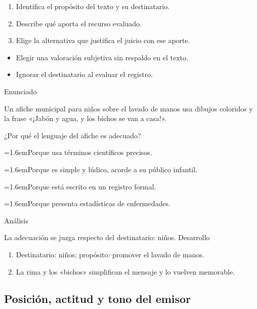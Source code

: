 \documentclass[10pt,a4paper,twocolumn]{article}
\newcommand{\alternativa}[2]{\par\noindent\hangindent=1.6em\hangafter=1\makebox[1.6em][l]{\tecla{#1}}#2\par}
\newcommand{\clave}[1]{\par\smallskip{\sffamily\footnotesize\color{esmeralda} Clave \teclaok{#1}}\par}
\begin{document}
\begin{metodo}
\begin{enumerate}
  \item Identifica el propósito del texto y su destinatario.
  \item Describe qué aporta el recurso evaluado.
  \item Elige la alternativa que justifica el juicio con ese aporte.
\end{enumerate}
\end{metodo}

\begin{errorfrecuente}
\begin{itemize}
  \item Elegir una valoración subjetiva sin respaldo en el texto.
  \item Ignorar el destinatario al evaluar el registro.
\end{itemize}
\end{errorfrecuente}

\begin{ejemplo}
{\sffamily\footnotesize\color{zinc500} Enunciado}\par
Un afiche municipal para niños sobre el lavado de manos usa dibujos coloridos y la frase «¡Jabón y agua, y los bichos se van a casa!».

¿Por qué el lenguaje del afiche es adecuado?
\alternativa{A}{Porque usa términos científicos precisos.}
\alternativa{B}{Porque es simple y lúdico, acorde a su público infantil.}
\alternativa{C}{Porque está escrito en un registro formal.}
\alternativa{D}{Porque presenta estadísticas de enfermedades.}
\clave{B}
{\sffamily\footnotesize\color{zinc500} Análisis}\par La adecuación se juzga respecto del destinatario: niños.
{\sffamily\footnotesize\color{zinc500} Desarrollo}
\begin{enumerate}
  \item Destinatario: niños; propósito: promover el lavado de manos.
  \item La rima y los «bichos» simplifican el mensaje y lo vuelven memorable.
\end{enumerate}
\end{ejemplo}

\subsection{Posición, actitud y tono del emisor}
\end{document}
